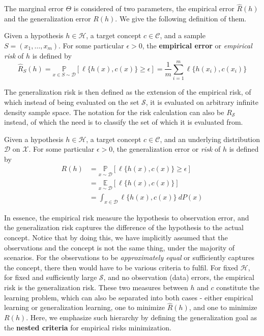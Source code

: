 \documentclass[
  journal=largetwo,
  year=2025,
  volume=37,
]{cup-journal}
\begin{document}
The marginal error $\Theta$ is considered of two parameters, the empirical error $\hat{R}(h)$ and the generalization error $R(h)$. We give the following definition of them. 

\begin{definition}
    Given a hypothesis $h\in \mathcal{H}$, a target concept $c\in \mathcal{C}$, and a sample $S=(x_{1},\dots,x_{m})$. For some particular $\epsilon>0$, the \textbf{empirical error} or \textit{empirical risk} of $h$ is defined by\begin{equation}
        \hat{R}_{S}(h) = \underset{x\in S\sim\mathcal{D}}{\mathbb{P}} [\ell\{h(x),c(x)\}\geq \epsilon] =\frac{1}{m} \sum_{i=1}^{m} \ell\{h(x_i),c(x_i)\}
    \end{equation}
\end{definition}

The generalization risk is then defined as the extension of the empirical risk, of which instead of being evaluated on the set $\mathcal{S}$, it is evaluated on arbitrary infinite density sample space. The notation for the risk calculation can also be $R_{\mathcal{S}}$ instead, of which the need is to classify the set of which it is evaluated from. 

\begin{definition}
    Given a hypothesis $h\in\mathcal{H}$, a target concept $c\in\mathcal{C}$, and an underlying distribution $\mathcal{D}$ on $\mathcal{X}$. For some particular $\epsilon>0$, the generalization error or \textit{risk} of $h$ is defined by
    \begin{equation}
        \begin{split}
          R(h) 
          &= \underset{x\sim\mathcal{D}}{\mathbb{P}} [\ell\{h(x),c(x)\}\geq \epsilon]\\
          &= \underset{x\sim\mathcal{D}}{\mathbb{E}}[\ell\{h(x),c(x)\}]\\ 
          &= \int_{x\in \mathcal{D}} \ell\{h(x),c(x)\} \: dP(x)
        \end{split}
    \end{equation}
\end{definition}

In essence, the empirical risk measure the hypothesis to observation error, and the generalization risk captures the difference of the hypothesis to the actual concept. Notice that by doing this, we have implicitly assumed that the observations and the concept is not the same thing, under the majority of scenarios. For the observations to be \textit{approximately equal} or sufficiently captures the concept, there then would have to be various criteria to fulfil. 
For fixed $\mathcal{H}$, for fixed and sufficiently large $\mathcal{S}$, and no observation (data) errors, the empirical risk is the generalization risk. These two measures between $h$ and $c$ constitute the learning problem, which can also be separated into both cases - either empirical learning or generalization learning, one to minimize $\hat{R}(h)$, and one to minimize $R(h)$. Here, we emphasize such hierarchy by defining the generalization goal as the \textbf{nested criteria} for empirical risks minimization. 
\end{document}
